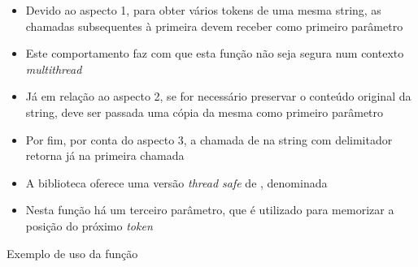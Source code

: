 \begin{frame}[fragile]{}

    \begin{itemize}
        \item Devido ao aspecto 1, para obter vários tokens de uma mesma string, as chamadas 
            subsequentes à primeira devem receber  como primeiro parâmetro
        \pause

        \item Este comportamento faz com que esta função não seja segura num contexto \textit{multithread}
        \pause

        \item Já em relação ao aspecto 2, se for necessário preservar o conteúdo original da string, deve ser passada uma cópia da mesma como primeiro parâmetro
        \pause

        \item Por fim, por conta do aspecto 3, a chamada de  na string
             com delimitador  retorna  já na 
            primeira chamada
        \pause

        \item A biblioteca  oferece uma versão \textit{thread safe} de , denominada 
        \pause

        \item Nesta função há um terceiro parâmetro, que é utilizado para memorizar a posição do próximo \textit{token}
    \end{itemize}

\end{frame}

\begin{frame}[fragile]{Exemplo de uso da função }
\end{frame}

